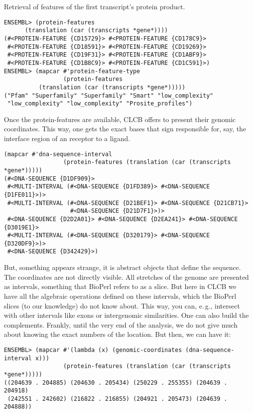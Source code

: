 \documentclass{book}
\newcommand\CLCB{CLCB }
\newcommand\eg{e.\,g.}
\begin{document}
Retrieval of features of the first transcript's protein product.

\begin{lstlisting}
ENSEMBL> (protein-features 
	  (translation (car (transcripts *gene*))))
(#<PROTEIN-FEATURE {CD15729}> #<PROTEIN-FEATURE {CD178C9}>
 #<PROTEIN-FEATURE {CD18591}> #<PROTEIN-FEATURE {CD19269}>
 #<PROTEIN-FEATURE {CD19F31}> #<PROTEIN-FEATURE {CD1ABF9}>
 #<PROTEIN-FEATURE {CD1B8C9}> #<PROTEIN-FEATURE {CD1C591}>)
ENSEMBL> (mapcar #'protein-feature-type
                 (protein-features 
		  (translation (car (transcripts *gene*)))))
("Pfam" "Superfamily" "Superfamily" "Smart" "low_complexity"
 "low_complexity" "low_complexity" "Prosite_profiles")
\end{lstlisting}

Once the protein-features are available, \CLCB offers to 
present their genomic coordinates. This way, one gets the
exact bases that sign responsible for, say, the interface
region of an receptor to a ligand.

\begin{lstlisting}
(mapcar #'dna-sequence-interval
                 (protein-features (translation (car (transcripts *gene*)))))
(#<DNA-SEQUENCE {D1DF909}>
 #<MULTI-INTERVAL (#<DNA-SEQUENCE {D1FD389}> #<DNA-SEQUENCE {D1FE011}>)>
 #<MULTI-INTERVAL (#<DNA-SEQUENCE {D21BEF1}> #<DNA-SEQUENCE {D21CB71}>
                   #<DNA-SEQUENCE {D21D7F1}>)>
 #<DNA-SEQUENCE {D2D2A01}> #<DNA-SEQUENCE {D2EA241}> #<DNA-SEQUENCE {D3019E1}>
 #<MULTI-INTERVAL (#<DNA-SEQUENCE {D320179}> #<DNA-SEQUENCE {D320DF9}>)>
 #<DNA-SEQUENCE {D342429}>)
\end{lstlisting}

But, something appears strange, it is abstract objects that define the sequence. The coordinates are
not directly visible. All stretches of the genome are presented
as intervals, something that BioPerl refers to as a slice. But here
in \CLCB we have all the algebraic operations defined on these intervals,
which the BioPerl slices (to our knowledge) do not know about. This way,
you can, \eg,  intersect with other intervals like exons or intergenomic
similarities.  One can also build the complements. Frankly, until the
very end of the analysis, we do not give much about knowing the exact
numbers of the location.  But then, we can have it:

\begin{lstlisting}
ENSEMBL> (mapcar #'(lambda (x) (genomic-coordinates (dna-sequence-interval x)))
                 (protein-features (translation (car (transcripts *gene*)))))
((204639 . 204885) (204630 . 205434) (250229 . 255355) (204639 . 204918)
 (242551 . 242602) (216822 . 216855) (204921 . 205473) (204639 . 204888))
\end{lstlisting}
\end{document}
